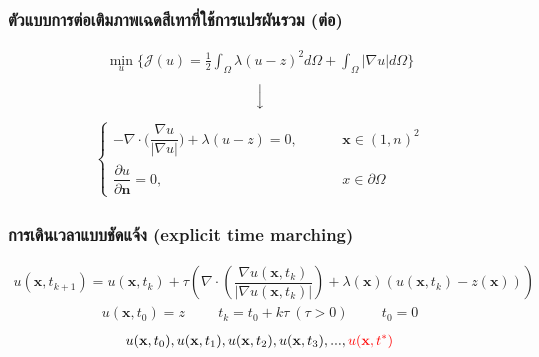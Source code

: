 \documentclass[xcolor=dvipsnames, xetex,serif]{beamer}
\numberwithin{equation}{section}
\begin{document}
		\begin{frame}
			\frametitle{ตัวแบบการต่อเติมภาพเฉดสีเทาที่ใช้การแปรผันรวม (ต่อ)}
			\begin{align*}
			\min_{u} \{ \mathcal{J}(u) = \frac{1}{2} \int_{\Omega}\lambda (u-z)^2 d\Omega +  \int_{\Omega}  |\nabla u|  d\Omega \}
			\end{align*}
			$$ \Big \downarrow$$
			\begin{align*}
			\left \{ \begin{array}{ll}  - \nabla \cdot  \Big( \dfrac{\nabla u}{|\nabla u|} \Big) + \lambda (u-z) = 0,  & \hspace{1cm} \mathbf{x} \in (1,n)^2 \\ \dfrac{\partial u}{\partial \boldsymbol{n}} = 0, & \hspace{1cm} x \in \partial \Omega \end{array} \right .
			\end{align*}			
		\end{frame} 
		\begin{frame}
			\frametitle{การเดินเวลาแบบชัดแจ้ง (explicit time marching)}
			\begin{align*}
			u(\mathbf{x},t_{k+1})=u(\mathbf{x},t_{k})+\tau\left(\nabla \cdot\left(\dfrac{\nabla u (\mathbf{x},t_k)}{| \nabla u (\mathbf{x},t_k) | }\right) + \lambda(\mathbf{x})(u (\mathbf{x},t_k)-z(\mathbf{x})) \right)
			\end{align*}
			\begin{align*}
			u(\mathbf{x},t_0)=z \hspace{1cm} t_k=t_0+k\tau\ (\tau>0)  \hspace{1cm}  t_0=0
			\end{align*}
			\vspace{1cm}
			\begin{align*}
				u(\mathbf{x},t_0), u(\mathbf{x},t_1), u(\mathbf{x},t_2), u(\mathbf{x},t_3), ... ,  \textcolor{red}{u(\mathbf{x},t^{*})}
			\end{align*}
			\let\thefootnote\relax{}			
		\end{frame} 
\end{document}
